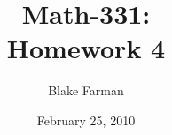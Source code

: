 \documentclass[10pt]{amsart}
\author{Blake Farman}
\title{Math-331:\\Homework 4}
\date{February 25, 2010}\pdfpagewidth 8.5in
\begin{document}
\maketitle

\newcommand{\Z}{\mathbb{Z}}
\newcommand{\R}{\mathbb{R}}
\newcommand{\Q}{\mathbb{Q}}
\newcommand{\C}{\mathbb{C}}

\renewcommand{\qedsymbol}{\(\blacksquare\)}
\renewcommand{\phi}{\varphi}
\renewcommand{\epsilon}{\varepsilon}

\newenvironment{alphaenum}{
  \begin{enumerate}
    \renewcommand{\theenumi}{(\alph{enumi})}
    \renewcommand{\labelenumi}{\theenumi}
  }
  {\end{enumerate}}
\newenvironment{as}{\begin{align*}}{\end{align*}}

\newtheorem{thm}{}
\end{document}
